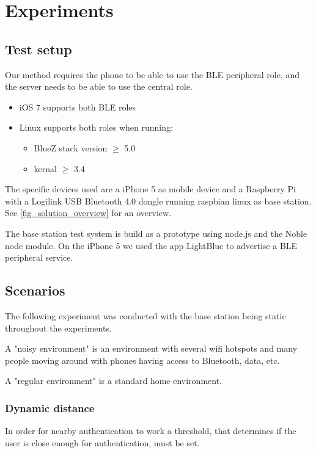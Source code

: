\section{Experiments}

\subsection{Test setup}

Our method requires the phone to be able to use the BLE peripheral role, and the server needs to be able to use the central role.
\begin{itemize}
	\item iOS 7 supports both BLE roles
	\item Linux supports both roles when running:
	\begin{itemize}
		\item BlueZ stack version $\geq$ 5.0
		\item kernal $\geq$ 3.4 
	\end{itemize}
\end{itemize}
%
The specific devices used are a iPhone 5 as mobile device and a Raspberry Pi with a Logilink USB Bluetooth 4.0 dongle running raspbian linux as base station. See \cref{fig_solution_overview} for an overview.

The base station test system is build as a prototype using node.js and the Noble node module.
On the iPhone 5 we used the app LightBlue to advertise a BLE peripheral service.


\subsection{Scenarios}

The following experiment was conducted with the base station being static throughout the experiments.

A "noisy environment" is an environment with several wifi hotspots and many people moving around with phones having access to Bluetooth, data, etc.

A "regular environment" is a standard home environment.


\subsubsection{Dynamic distance}
\label{section:MovingTowardsSystem}
In order for nearby authentication to work a threshold, that determines if the user is close enough for authentication, must be set.


